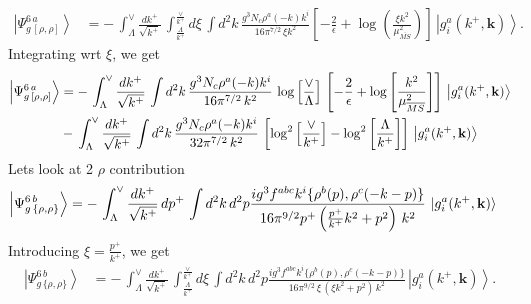 \documentclass[aps,prd,amsmath,amssymb,nofootinbib]{revtex4-2}
\numberwithin{equation}{section}
\begin{document}
\begin{align}
\left|\Psi_{g\,[\rho,\rho]}^{6\, a}\right\rangle & = -\, \int_{\Lambda}^{\vee} \frac{dk^{+}}{\sqrt{k^{+}}}\,\int_{\frac{\Lambda}{k^{+}}}^{\frac{\vee}{k^{+}}} d\xi\, \int d^{2}k\, \frac{g^{3}N_{c}\rho^{a}(-k)k^{i}}{16\pi^{7/2}\,\xi k^{2}}\left[-\frac{2}{\epsilon}+\log{\left(\frac{\xi k^{2}}{\mu^{2}_{\overline{MS}}}\right)}\right]\, \left|g_{i}^{a}(k^{+},\mathbf{k})\right\rangle.
\end{align}
Integrating wrt $\xi$, we get
\begin{align}\label{onerhopart}
    \left|\Psi_{g\,[\rho,\rho]}^{6\, a}\right\rangle & = -\, \int_{\Lambda}^{\vee} \frac{dk^{+}}{\sqrt{k^{+}}}\, \int d^{2}k\, \frac{g^{3}N_{c}\rho^{a}(-k)k^{i}}{16\pi^{7/2}\, k^{2}}\,\log{\left[\frac{\vee}{\Lambda}\right]}\,\left[-\frac{2}{\epsilon} + \log{\left[\frac{k^{2}}{\mu^{2}_{\overline{MS}}}\right]}\right]\,\left|g_{i}^{a}(k^{+},\mathbf{k})\right\rangle\notag \\ & -\, \int_{\Lambda}^{\vee} \frac{dk^{+}}{\sqrt{k^{+}}}\, \int d^{2}k\, \frac{g^{3}N_{c}\rho^{a}(-k)k^{i}}{32\pi^{7/2}\, k^{2}}\,\left[\log^{2}{\left[\frac{\vee}{k^{+}}\right]} - \log^{2}{\left[\frac{\Lambda}{k^{+}}\right]}\right]\,\left|g_{i}^{a}(k^{+},\mathbf{k})\right\rangle
\end{align}
Lets look at 2 $\rho$ contribution
\begin{align}
\left|\Psi_{g\,\{\rho,\rho\}}^{6\, b}\right\rangle & = -\,\int_{\Lambda}^{\vee} \frac{dk^{+}}{\sqrt{k^{+}}}\, dp^{+}\, \int d^{2}k \, d^{2}p \frac{ig^{3}f^{abc}k^{i}\{\rho^{b}(p),\rho^{c}(-k-p)\}}{16\pi^{9/2}p^{+}\left(\frac{p^{+}}{k^{+}}k^{2}+p^{2}\right)\,k^{2}}\, \ket{g^{a}_{i}(k^{+},\mathbf{k})}
\end{align}
Introducing $\xi = \frac{p^{+}}{k^{+}}$, we get
\begin{align}
    \left|\Psi_{g\,\{\rho,\rho\}}^{6\, b}\right\rangle & =-\,\int_{\Lambda}^{\vee} \frac{dk^{+}}{\sqrt{k^{+}}}\, \int_{\frac{\Lambda}{k^{+}}}^{\frac{\vee}{k^{+}}}d\xi\, \int d^{2}k \, d^{2}p \frac{ig^{3}f^{abc}k^{i}\{\rho^{b}(p),\rho^{c}(-k-p)\}}{16\pi^{9/2}\,\xi\,\left(\xi k^{2}+p^{2}\right)\,k^{2}}\, \left|g_{i}^{a}(k^{+},\mathbf{k})\right\rangle.
\end{align}
\end{document}
